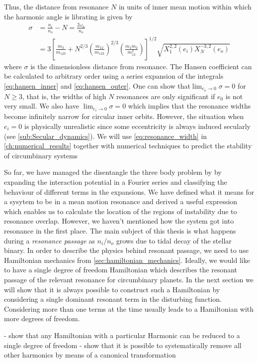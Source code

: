 Thus, the distance from resonance $N$ in units of inner mean motion
within which the harmonic angle is librating is given by
\begin{equation}
    \begin{aligned}
        \sigma&=\frac{n_i}{n_o} -N= \frac{2\omega_n}{n_o}\\ 
        &= 3\left[ \frac{m_3}{m_{123}} +
    N^{2/3}\left( \frac{m_{12}}{m_{123}}
        \right)^{2/3}\left( \frac{m_1m_2}{m_{12}^2} \right)\right]^{1/2}
        \sqrt{X^{2,2}_1(e_i)X^{-3,2}_N(e_o)}
    \end{aligned}
    \label{eq:resonance_width}
\end{equation}
where $\sigma$ is the dimensionless distance from resonance. The Hansen
coefficient can be calculated to arbitrary order using a series expansion
of the integrals \ref{eq:hansen_inner} and \ref{eq:hansen_outer}. One can
show that$\lim_{e_o\rightarrow 0}\sigma=0$ for $N\geq 3$, that is, the 
widths of high $N$ resonances are only significant if $e_0$ is not very
small. We also have $\lim_{e_i\rightarrow 0}\sigma=0$ which implies that
the resonance widths become infinitely narrow for circular inner orbits.
However, the situation when $e_i=0$ is physically unrealistic since some
eccentricity is always induced secularly (see \cref{sub:Secular_dynamics}).
We will use \cref{eq:resonance_width} in 
\cref{ch:numerical_results} together with numerical techniques to predict the
stability of circumbinary systems

So far, we have managed the disentangle the three body problem by
by expanding the interaction potential in a Fourier series and 
classifying the behaviour of different terms in the expansions. We have
defined what it means for a sysytem to be in a mean motion resonance and
derived a useful expression which enables us to calculate the location of 
the regions of instability due to resonance overlap. However, we haven't
mentioned how the system got into resonance in the first place. The main
subject of this thesis is what happens during a \emph{resonance
passage} as $n_i/n_o$ grows due to tidal decay of the stellar binary.
In order to describe the physics behind resonant passage, we need to use
Hamiltonian mechanics from \cref{sec:hamiltonian_mechanics}. Ideally, we
would like to have a single degree of freedom Hamiltonian which describes
the resonant passage of the relevant resonance for circumbinary planets.
In the next section we will show that it is always possible to construct 
such a Hamiltonian by considering a single dominant resonant term in 
the disturbing function. Considering more than one terms at the time
usually leads to a Hamiltonian with more degrees of freedom.

- show that any Hamiltonian with a particular Harmonic can be reduced to
a single degree of freedom
- show that it is possible to systematically remove all other harmonics
by means of a canonical transformation
